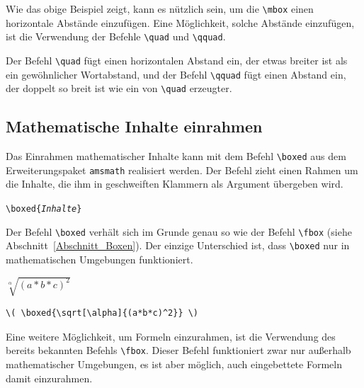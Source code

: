 \documentclass[a4paper,10pt,twoside]{scrbook}
\begin{document}
{Wie das obige Beispiel zeigt, kann es nützlich sein,
um die \verb!\mbox! einen horizontale Abstände einzufügen.
Eine Möglichkeit, solche Abstände einzufügen, ist die Verwendung der Befehle 
\verb!\quad! und \verb!\qquad!.


Der Befehl \verb!\quad!  
fügt einen horizontalen 
Abstand ein, der etwas breiter ist
als ein gewöhnlicher Wortabstand, und der 
Befehl \verb!\qquad!  
fügt einen Abstand 
ein, der doppelt so breit ist wie
ein von \verb!\quad! erzeugter.



\subsection{Mathematische Inhalte einrahmen}

Das Einrahmen mathematischer Inhalte kann mit dem 
Befehl \verb!\boxed!  
aus dem Erweiterungspaket \verb!amsmath! 
realisiert werden. Der Befehl zieht einen Rahmen 
um die Inhalte, die ihm in geschweiften
Klammern als Argument übergeben wird. 

\texttt{\textbackslash boxed\{\textsl{Inhalte}\}}

Der Befehl \verb!\boxed!
verhält sich im 
Grunde genau so wie der 
Befehl \verb!\fbox! 
(siehe Abschnitt~\ref{Abschnitt_Boxen}).
Der einzige Unterschied ist, dass \verb!\boxed! nur
in mathematischen Umgebungen funktioniert.



\begin{minipage}[c]{.38\textwidth}
\setlength{\parskip}{1em}
\centering
\( \boxed{\sqrt[\alpha]{(a*b*c)^2}} \)
\end{minipage}
\hfill
\begin{minipage}[c]{.6\textwidth}
\setlength{\parskip}{1em}
\begin{lstlisting}[label=boxedbeispiel, style=customlatex]
\( \boxed{\sqrt[\alpha]{(a*b*c)^2}} \)
\end{lstlisting}
\end{minipage}


Eine weitere Möglichkeit, um Formeln 
einzurahmen, ist die Verwendung des bereits bekannten Befehls \verb!\fbox!.
Dieser Befehl funktioniert zwar nur außerhalb mathematischer Umgebungen,
es ist aber möglich, auch eingebettete Formeln damit einzurahmen.


}
\end{document}
